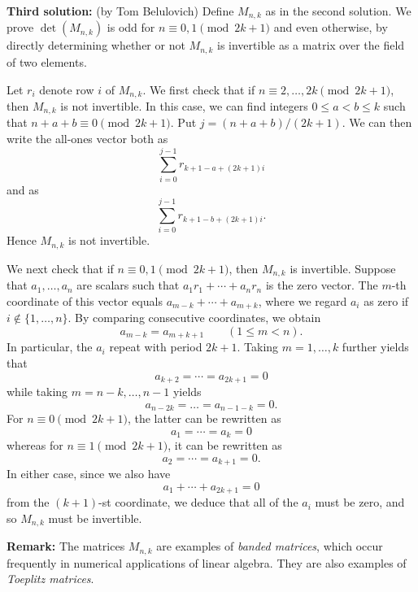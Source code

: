 \documentclass[amssymb,twocolumn,pra,10pt,aps]{revtex4-1}
\begin{document}
\begin{itemize}
\textbf{Third solution:} (by Tom Belulovich)
Define $M_{n,k}$ as in the second solution. We prove
$\det(M_{n,k})$ is odd for $n \equiv 0,1 \pmod{2k+1}$ and even otherwise,
by directly determining whether or not $M_{n,k}$ is invertible as a matrix
over the field of two elements.

Let $r_i$ denote row $i$ of $M_{n,k}$.
We first check that if $n \equiv 2, \dots, 2k \pmod{2k+1}$, then $M_{n,k}$
is not invertible. In this case, we can find integers $0 \leq a < b \leq k$
such that $n + a + b \equiv 0 \pmod{2k+1}$.
Put $j = (n+a+b)/(2k+1)$. We can then write the
all-ones vector both as
\[
\sum_{i=0}^{j-1} r_{k+1-a + (2k+1)i}
\]
and as
\[
\sum_{i=0}^{j-1} r_{k+1-b + (2k+1)i}.
\]
Hence $M_{n,k}$ is not invertible.

We next check that if $n \equiv 0,1 \pmod{2k+1}$, then $M_{n,k}$
is invertible. Suppose that $a_1,\dots,a_n$ are scalars such that
$a_1 r_1 + \cdots + a_n r_n$ is the zero vector. The $m$-th coordinate
of this vector equals $a_{m-k} + \cdots + a_{m+k}$, where we regard
$a_i$ as zero if $i \notin \{1,\dots,n\}$. By comparing consecutive
coordinates, we obtain
\[
a_{m-k} = a_{m+k+1} \qquad (1 \leq m < n).
\]
In particular, the $a_i$ repeat with period $2k+1$.
Taking $m=1,\dots,k$ further yields that
\[
a_{k+2} = \cdots = a_{2k+1} = 0
\]
while taking $m=n-k, \dots,n-1$ yields
\[
a_{n-2k} =  \dots = a_{n-1-k} = 0.
\]
For $n \equiv 0 \pmod{2k+1}$, the latter can be rewritten as
\[
a_1 = \cdots = a_k = 0
\]
whereas for $n \equiv 1 \pmod{2k+1}$, it can be rewritten as
\[
a_2 = \cdots = a_{k+1} = 0.
\]
In either case, since we also have
\[
a_1 + \cdots + a_{2k+1} = 0
\]
from the $(k+1)$-st coordinate, we deduce that all of the $a_i$ must be
zero, and so $M_{n,k}$ must be invertible.


\textbf{Remark:}
The matrices $M_{n,k}$ are examples of \emph{banded matrices},
which occur frequently in numerical applications of linear algebra.
They are also examples of \emph{Toeplitz matrices}.

\end{itemize}
\end{document}
